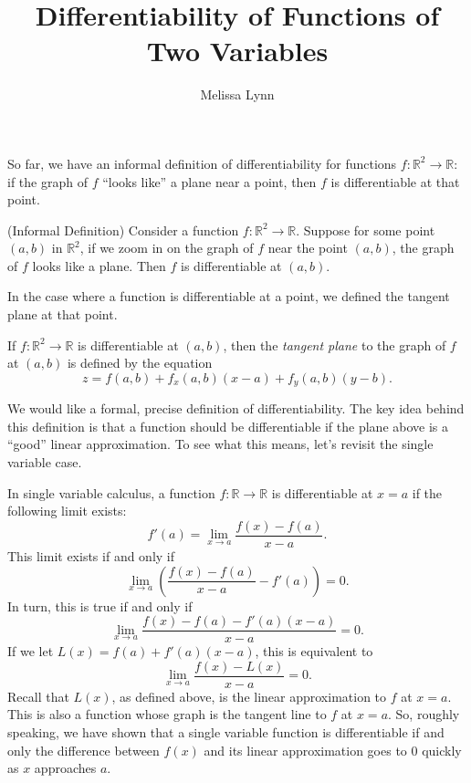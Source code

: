 \documentclass{ximera}
\title{Differentiability of Functions of Two Variables}
\author{Melissa Lynn}
\begin{document}
\begin{abstract}
\end{abstract}
\maketitle

So far, we have an informal definition of differentiability for functions $f:\mathbb{R}^2\rightarrow \mathbb{R}$: if the graph of $f$ ``looks like'' a plane near a point, then $f$ is differentiable at that point.

\begin{definition}
(Informal Definition) Consider a function $f:\mathbb{R}^2\rightarrow \mathbb{R}$. Suppose for some point $(a,b)$ in $\mathbb{R}^2$, if we zoom in on the graph of $f$ near the point $(a,b)$, the graph of $f$ looks like a plane. Then $f$ is differentiable at $(a,b)$.
\end{definition}

In the case where a function is differentiable at a point, we defined the tangent plane at that point.

\begin{definition}
If $f:\mathbb{R}^2\rightarrow\mathbb{R}$ is differentiable at $(a,b)$, then the \emph{tangent plane} to the graph of $f$ at $(a,b)$ is defined by the equation
\[
z=f(a,b)+f_x(a,b)(x-a)+f_y(a,b)(y-b).
\]
\end{definition}

We would like a formal, precise definition of differentiability. The key idea behind this definition is that a function should be differentiable if the plane above is a ``good'' linear approximation. To see what this means, let's revisit the single variable case.

In single variable calculus, a function $f:\mathbb{R}\rightarrow\mathbb{R}$ is differentiable at $x=a$ if the following limit exists:
\[
f'(a) = \lim_{x\rightarrow a}\frac{f(x)-f(a)}{x-a}.
\]
This limit exists if and only if
\[
\lim_{x\rightarrow a}\left(\frac{f(x)-f(a)}{x-a} - f'(a)\right) = 0.
\]
In turn, this is true if and only if
\[
\lim_{x\rightarrow a}\frac{f(x)-f(a)-f'(a)(x-a)}{x-a} = 0.
\]
If we let $L(x) = f(a) + f'(a)(x-a)$, this is equivalent to
\[
\lim_{x\rightarrow a}\frac{f(x)-L(x)}{x-a} = 0.
\]
Recall that $L(x)$, as defined above, is the linear approximation to $f$ at $x=a$. This is also a function whose graph is the tangent line to $f$ at $x=a$. So, roughly speaking, we have shown that a single variable function is differentiable if and only the difference between $f(x)$ and its linear approximation goes to $0$ quickly as $x$ approaches $a$.
\end{document}
